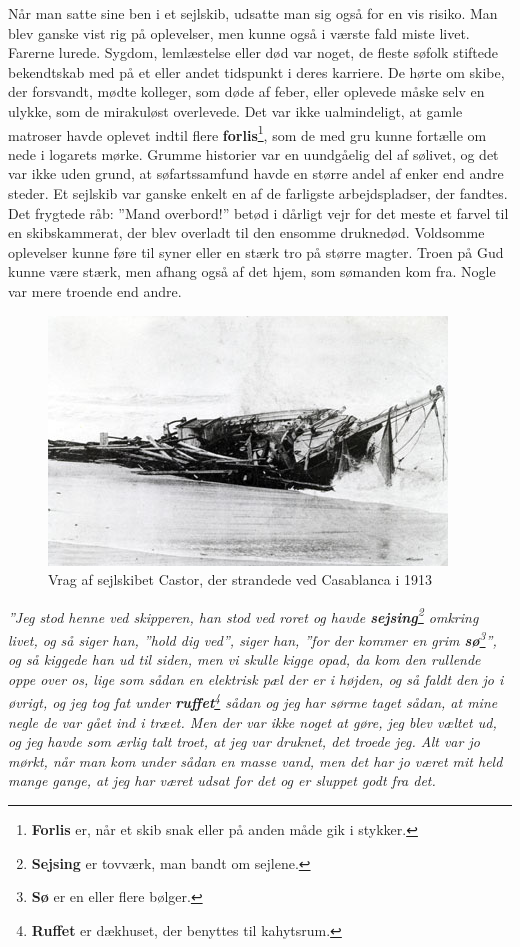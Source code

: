 Når man satte sine ben i et sejlskib, udsatte man sig også for en vis
risiko. Man blev ganske vist rig på oplevelser, men kunne også i værste
fald miste livet. Farerne lurede. Sygdom, lemlæstelse eller død var
noget, de fleste søfolk stiftede bekendtskab med på et eller andet
tidspunkt i deres karriere. De hørte om skibe, der forsvandt, mødte
kolleger, som døde af feber, eller oplevede måske selv en ulykke, som de
mirakuløst overlevede. Det var ikke ualmindeligt, at gamle matroser
havde oplevet indtil flere \textbf{forlis}\footnote{\textbf{Forlis} er,
  når et skib snak eller på anden måde gik i stykker.}, som de med gru
kunne fortælle om nede i logarets mørke. Grumme historier var en
uundgåelig del af sølivet, og det var ikke uden grund, at søfartssamfund
havde en større andel af enker end andre steder. Et sejlskib var ganske
enkelt en af de farligste arbejdspladser, der fandtes. Det frygtede råb:
''Mand overbord!'' betød i dårligt vejr for det meste et farvel til en
skibskammerat, der blev overladt til den ensomme druknedød. Voldsomme
oplevelser kunne føre til syner eller en stærk tro på større magter.
Troen på Gud kunne være stærk, men afhang også af det hjem, som sømanden
kom fra. Nogle var mere troende end andre.

\begin{figure}
\centering
\includegraphics{images/sejlskibe_tema-6-vrag.jpg}
\caption{Vrag af sejlskibet Castor, der strandede ved Casablanca i 1913}
\end{figure}

\emph{''Jeg stod henne ved skipperen, han stod ved roret og havde
\textbf{sejsing}\footnote{\textbf{Sejsing} er tovværk, man bandt om
  sejlene.} omkring livet, og så siger han, ''hold dig ved'', siger han,
''for der kommer en grim \textbf{sø}\footnote{\textbf{Sø} er en eller
  flere bølger.}'', og så kiggede han ud til siden, men vi skulle kigge
opad, da kom den rullende oppe over os, lige som sådan en elektrisk pæl
der er i højden, og så faldt den jo i øvrigt, og jeg tog fat under
\textbf{ruffet}\footnote{\textbf{Ruffet} er dækhuset, der benyttes til
  kahytsrum.} sådan og jeg har sørme taget sådan, at mine negle de var
gået ind i træet. Men der var ikke noget at gøre, jeg blev væltet ud, og
jeg havde som ærlig talt troet, at jeg var druknet, det troede jeg. Alt
var jo mørkt, når man kom under sådan en masse vand, men det har jo
været mit held mange gange, at jeg har været udsat for det og er sluppet
godt fra det.}

